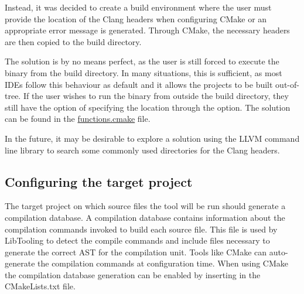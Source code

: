 Instead, it was decided to create a build environment where the user must provide the location of the Clang headers when configuring CMake or an appropriate error message is generated. Through CMake, the necessary headers are then copied to the build directory.

The solution is by no means perfect, as the user is still forced to execute the binary from the build directory. In many situations, this is sufficient, as most IDEs follow this behaviour as default and it allows the projects to be built out-of-tree. If the user wishes to run the binary from outside the build directory, they still have the option of specifying the location through the  option. The solution can be found in the \href{https://github.com/mortenhaahr/RD/blob/main/examples/c_style_array_converter/cmake/functions.cmake}{functions.cmake} file.

In the future, it may be desirable to explore a solution using the LLVM command line library to search some commonly used directories for the Clang headers.

\subsection{Configuring the target project}

The target project on which source files the tool will be run should generate a compilation database. A compilation database contains information about the compilation commands invoked to build each source file. This file is used by LibTooling to detect the compile commands and include files necessary to generate the correct AST for the compilation unit.\cite{clangJSONCompilationDatabase} Tools like CMake can auto-generate the compilation commands at configuration time. When using CMake the compilation database generation can be enabled by inserting  in the CMakeLists.txt file.